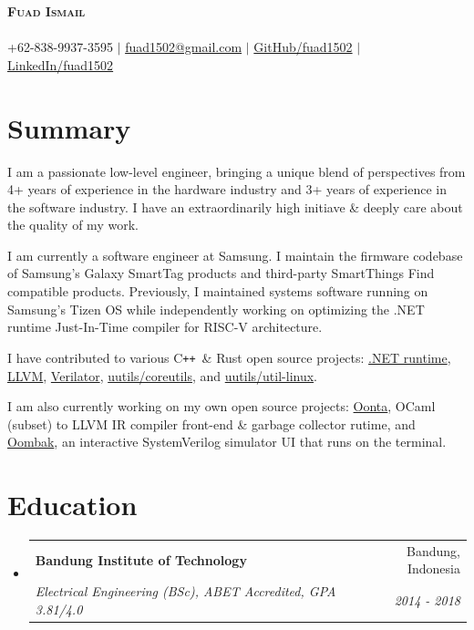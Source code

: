 \documentclass[letterpaper,11pt]{article}
\makeatletter
\newcommand{\resumeSubheading}[4]{
  \vspace{-2pt}\item
    \begin{tabular*}{0.97\textwidth}[t]{l@{\extracolsep{\fill}}r}
      \textbf{#1} & #2 \\
      \textit{\small#3} & \textit{\small #4} \\
    \end{tabular*}\vspace{-7pt}
}
\newcommand{\resumeSubHeadingListStart}{\begin{itemize}[leftmargin=0.15in, label={}]}
\newcommand{\resumeSubHeadingListEnd}{\end{itemize}}
\newcommand{\githubPRs}[2]{\href{https://github.com/#1/pulls?q=is\%3Apr+author\%3Afuad1502}{#2}}
\newcommand\CC{C\texttt{++}}
\makeatother
\begin{document}
\begin{center}
	\textbf{\Huge \scshape Fuad Ismail} \\
	\vspace{1pt} \small \textit{} \\
  +62-838-9937-3595 $|$ \href{mailto:fuad1502@gmail.com}{fuad1502@gmail.com} $|$ \href{https://github.com/fuad1502}{GitHub/fuad1502} $|$ \href{https://www.linkedin.com/in/fuad1502/}{LinkedIn/fuad1502}
\end{center}

\section*{Summary}
\justifying

I am a passionate low-level engineer, bringing a unique blend of perspectives
from 4+ years of experience in the hardware industry and 3+ years of experience
in the software industry. I have an extraordinarily high initiave \& deeply
care about the quality of my work.

I am currently a software engineer at Samsung. I maintain the firmware codebase
of Samsung's Galaxy SmartTag products and third-party SmartThings Find
compatible products. Previously, I maintained systems software running on
Samsung's Tizen OS while independently working on optimizing the .NET runtime
Just-In-Time compiler for RISC-V architecture.

I have contributed to various \CC\ \& Rust open source projects:
\githubPRs{dotnet/runtime}{.NET runtime}, \githubPRs{llvm/llvm-project}{LLVM},
\githubPRs{verilator/verilator}{Verilator},
\githubPRs{uutils/coreutils}{uutils/coreutils}, and
\githubPRs{uutils/util-linux}{uutils/util-linux}.

I am also currently working on my own open source projects:
\href{https://github.com/fuad1502/oonta}{Oonta}, OCaml (subset) to LLVM IR
compiler front-end \& garbage collector rutime, and
\href{https://github.com/fuad1502/oombak}{Oombak}, an interactive SystemVerilog
simulator UI that runs on the terminal.

\section{Education}
\resumeSubHeadingListStart
\resumeSubheading
{Bandung Institute of Technology}{Bandung, Indonesia}
{Electrical Engineering (BSc), ABET Accredited, GPA 3.81/4.0}{2014 - 2018}
\resumeSubHeadingListEnd
\end{document}
